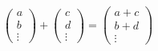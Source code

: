 \documentclass[12pt]{article}
\begin{document}
\begin{align*}
	\begin{pmatrix}a\\b\\\vdots\end{pmatrix}
	 +
	\begin{pmatrix}c\\d\\\vdots\end{pmatrix}
	 =
	\begin{pmatrix}a+c\\b+d\\\vdots\end{pmatrix}%
\end{align*}
\end{document}

